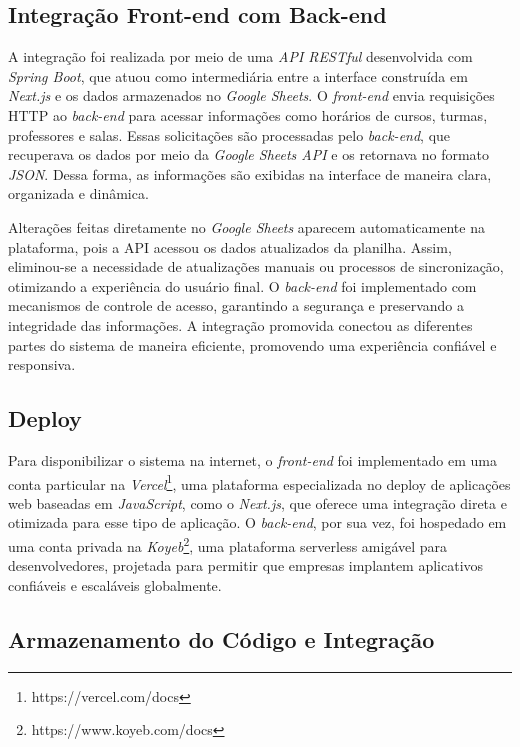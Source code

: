 \subsection{Integração Front-end com Back-end}

A integração foi realizada por meio de uma \textit{API RESTful} desenvolvida com \textit{Spring Boot}, que atuou como intermediária entre a interface construída em \textit{Next.js} e os dados armazenados no \textit{Google Sheets}. O \textit{front-end} envia requisições HTTP ao \textit{back-end} para acessar informações como horários de cursos, turmas, professores e salas. Essas solicitações são processadas pelo \textit{back-end}, que recuperava os dados por meio da \textit{Google Sheets API} e os retornava no formato \textit{JSON}. Dessa forma, as informações são exibidas na interface de maneira clara, organizada e dinâmica.

Alterações feitas diretamente no \textit{Google Sheets} aparecem automaticamente na plataforma, pois a API acessou os dados atualizados da planilha. Assim, eliminou-se a necessidade de atualizações manuais ou processos de sincronização, otimizando a experiência do usuário final. O \textit{back-end} foi implementado com mecanismos de controle de acesso, garantindo a segurança e preservando a integridade das informações. A integração promovida conectou as diferentes partes do sistema de maneira eficiente, promovendo uma experiência confiável e responsiva.

\subsection{Deploy}

Para disponibilizar o sistema na internet, o \textit{front-end} foi implementado em uma conta particular na \textit{Vercel}\footnote{https://vercel.com/docs}, uma plataforma especializada no deploy de aplicações web baseadas em \textit{JavaScript}, como o \textit{Next.js}, que oferece uma integração direta e otimizada para esse tipo de aplicação. O \textit{back-end}, por sua vez, foi hospedado em uma conta privada na \textit{Koyeb}\footnote{https://www.koyeb.com/docs}, uma plataforma serverless amigável para desenvolvedores, projetada para permitir que empresas implantem aplicativos confiáveis e escaláveis globalmente.

\subsection{Armazenamento do Código e Integração}

